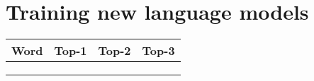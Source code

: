 \section{Training new language models}

\begin{table}[hb]
\center
\begin{tabular}{|l|l|l|l|}
\hline
\textbf{Word} & \textbf{Top-1} & \textbf{Top-2} & \textbf{Top-3} \\ \hline
              &                &                &                \\ \hline
              &                &                &                \\ \hline
              &                &                &                \\ \hline
\end{tabular}
\end{table}

